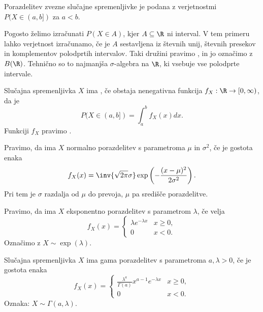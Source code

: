 \begin{definicija}
  Porazdelitev zvezne slučajne spremenljivke je podana z verjetnostmi
  $P(X \in (a, b])$ za $a < b$.
\end{definicija}

\begin{opomba}
  Pogosto želimo izračunati $P(X \in A)$, kjer $A \subseteq \R$ ni interval.
  V tem primeru lahko verjetnost izračunamo, če je $A$ sestavljena iz števnih
  unij, števnih presekov in komplementov polodprtih intervalov.
  Taki družini pravimo , in jo označimo z $B(\R)$.
  Tehnično so to najmanjša $\sigma$-algebra na $\R$, ki vsebuje vse polodprte
  intervale.
\end{opomba}

\begin{definicija}
  Slučajna spremenljivka $X$ ima , če obstaja
  nenegativna funkcija $f_X : \R \to [0, \infty)$, da je
  \[
	P(X \in (a,b]) = \int_a^b f_X(x) dx.
  \]
  Funkciji $f_X$ pravimo .
\end{definicija}


\begin{primer}
  Pravimo, da ima $X$ normalno porazdelitev s parametroma $\mu$ in $\sigma^2$,
  če je gostota enaka
  \[
	f_X(x) = \inv{\sqrt{2\pi} \sigma} \exp\left(-\frac{(x-\mu)^2}{2 \sigma^2}\right).
  \]
  Pri tem je $\sigma$ razdalja od $\mu$ do prevoja, $\mu$ pa središče
  porazdelitve.
\end{primer}


\begin{primer}
  Pravimo, da ima $X$ eksponentno porazdelitev s parametrom $\lambda$, če velja
  \[
	f_X(x) =
	\begin{cases}
	  \lambda e^{-\lambda x} & x \ge 0, \\
	  0 & x < 0.
	\end{cases}
  \]
  Označimo z $X \sim \operatorname{exp}(\lambda)$.
\end{primer}

\begin{primer}
  Slučajna spremenljivka $X$ ima gama porazdelitev s parametroma $a, \lambda >
  0$, če je gostota enaka
  \[
	f_X(x) =
	\begin{cases}
	  \frac{\lambda^a}{\Gamma(a)} x^{a-1} e^{-\lambda x} & x \ge 0, \\
	  0 & x < 0.
	\end{cases}
  \]
  Oznaka: $X \sim \Gamma(a, \lambda)$.
\end{primer}

